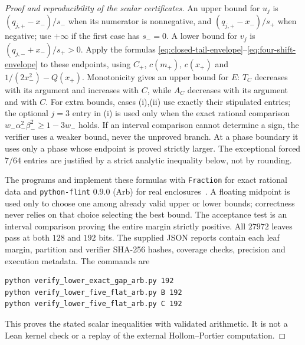 \documentclass[11pt]{article}
\theoremstyle{remark}\newtheorem{remark}[theorem]{Remark}
\begin{document}
\begin{proof}[Proof and reproducibility of the scalar certificates]
An upper bound for $u_j$ is
$(q_{j,+}-x_-)/s_-$ when its numerator is nonnegative, and
$(q_{j,+}-x_-)/s_+$ when negative; use $+\infty$ if the first
case has $s_-=0$. A lower bound for $v_j$ is
$(q_{j,-}+x_-)/s_+>0$. Apply the formulas
\eqref{eq:closed-tail-envelope}--\eqref{eq:four-shift-envelope}
to these endpoints, using $C_+$, $c(m_+)$, $c(x_+)$ and
$1/(2x_-^2)-Q(x_+)$. Monotonicity gives an upper bound for $E$:
$T_C$ decreases with its argument and increases with $C$, while
$A_C$ decreases with its argument and with $C$.
For extra bounds, cases (i),(ii) use exactly their stipulated entries;
the optional $j=3$ entry in (i) is used only when the exact rational
comparison $w_-\alpha_-^2\beta_-^2\ge1-3w_-$ holds.
If an interval comparison cannot determine a sign, the verifier uses
a weaker bound, never the unproved branch. At a phase boundary it
uses only a phase whose endpoint is proved strictly larger. The
exceptional forced $7/64$ entries are justified by a strict analytic
inequality below, not by rounding.

The programs  and
 implement these formulas with
\texttt{Fraction} for exact rational data and \texttt{python-flint}
0.9.0 (Arb) for real enclosures~\cite{Arb,PythonFlint}. A floating midpoint is used only to
choose one among already valid upper or lower bounds; correctness
never relies on that choice selecting the best bound. The acceptance
test is an interval comparison proving the entire margin strictly
positive. All $27972$ leaves pass at both $128$ and $192$ bits.
The supplied JSON reports contain each leaf margin, partition and
verifier SHA-256 hashes, coverage checks, precision and execution
metadata. The commands are
\begin{verbatim}
python verify_lower_exact_gap_arb.py 192
python verify_lower_five_flat_arb.py B 192
python verify_lower_five_flat_arb.py C 192
\end{verbatim}
This proves the stated scalar inequalities with validated arithmetic.
It is not a Lean kernel check or a replay of the external Hollom--Portier
computation.
\end{proof}
\end{document}
